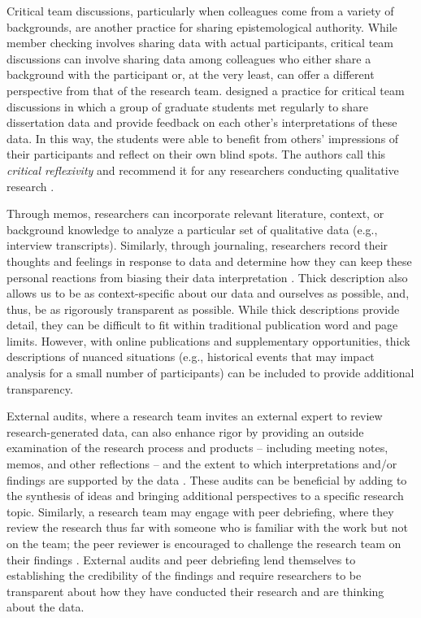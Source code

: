 \documentclass[authordate, meta]{jote-new-article}
\begin{document}
Critical team discussions, particularly when colleagues come from a variety of backgrounds, are another practice for sharing epistemological authority. While member checking involves sharing data with actual participants, critical team discussions can involve sharing data among colleagues who either share a background with the participant or, at the very least, can offer a different perspective from that of the research team. \parencites{Mao2016} designed a practice for critical team discussions in which a group of graduate students met regularly to share dissertation data and provide feedback on each other’s interpretations of these data. In this way, the students were able to benefit from others’ impressions of their participants and reflect on their own blind spots. The authors call this \emph{critical reflexivity} and recommend it for any researchers conducting qualitative research \parencites[e.g.,][]{Fook2007}{Mao2016}.



Through memos, researchers can incorporate relevant literature, context, or background knowledge to analyze a particular set of qualitative data (e.g., interview transcripts). Similarly, through journaling, researchers record their thoughts and feelings in response to data and determine how they can keep these personal reactions from biasing their data interpretation \parencites{Meyer2019}. Thick description \parencites{Geertz1973} also allows us to be as context-specific about our data and ourselves as possible, and, thus, be as rigorously transparent as possible. While thick descriptions provide detail, they can be difficult to fit within traditional publication word and page limits. However, with online publications and supplementary opportunities, thick descriptions of nuanced situations (e.g., historical events that may impact analysis for a small number of participants) can be included to provide additional transparency.



External audits, where a research team invites an external expert to review research-generated data, can also enhance rigor by providing an outside examination of the research process and products – including meeting notes, memos, and other reflections – and the extent to which interpretations and/or findings are supported by the data \parencites{Creswell2000}{Lincoln1986}{Rodgers1993}{Wolf2003}. These audits can be beneficial by adding to the synthesis of ideas and bringing additional perspectives to a specific research topic. Similarly, a research team may engage with peer debriefing, where they review the research thus far with someone who is familiar with the work but not on the team; the peer reviewer is encouraged to challenge the research team on their findings \parencites{Creswell2000}. External audits and peer debriefing lend themselves to establishing the credibility of the findings and require researchers to be transparent about how they have conducted their research and are thinking about the data.
\end{document}
